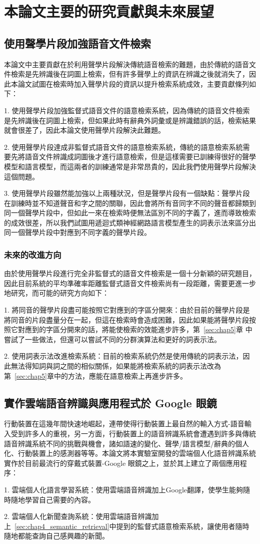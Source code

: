 \section{本論文主要的研究貢獻與未來展望}
\subsection{使用聲學片段加強語音文件檢索}
本論文中主要貢獻在於利用聲學片段解決傳統語音檢索的難題，由於傳統的語音文件檢索是先辨識後在詞圖上檢索，但有許多聲學上的資訊在辨識之後就消失了，因此本論文試圖在檢索時加入聲學片段的資訊以提升檢索系統成效，主要貢獻條列如下：

1. 使用聲學片段加強監督式語音文件的語意檢索系統，因為傳統的語音文件檢索是先辨識後在詞圖上檢索，但如果此時有辭典外詞彙或是辨識錯誤的話，檢索結果就會很差了，因此本論文使用聲學片段解決此難題。

2. 使用聲學片段達成非監督式語音文件的語意檢索系統，傳統的語意檢索系統需要先將語音文件辨識成詞圖後才進行語意檢索，但是這樣需要已訓練得很好的聲學模型和語言模型，而這兩者的訓練通常是非常昂貴的，因此我們使用聲學片段解決這個問題。

3. 使用聲學片段雖然能加強以上兩種狀況，但是聲學片段有一個缺點：聲學片段在訓練時並不知道聲音和字之間的關聯，因此會將所有音同字不同的聲音都歸類到同一個聲學片段中，但如此一來在檢索時便無法區別不同的字義了，進而導致檢索的成效很差，所以我們試圖用遞迴式類神經網路語言模型產生的詞表示法來區分出同一個聲學片段中對應到不同字義的聲學片段。

\subsubsection{未來的改進方向}
由於使用聲學片段進行完全非監督式的語音文件檢索是一個十分新穎的研究題目，因此目前系統的平均準確率距離監督式語音文件檢索尚有一段距離，需要更進一步地研究，而可能的研究方向如下：

1. 將同音的聲學片段盡可能按照它對應到的字區分開來：由於目前的聲學片段是將同音的片段盡量分在一起，但這在檢索時會造成困難，因此如果能將聲學片段按照它對應到的字區分開來的話，將能使檢索的效能進步許多，第~\ref{sec:chap5}章 中嘗試了一些做法，但還可以嘗試不同的分群演算法和更好的詞表示法。

2. 使用詞表示法改進檢索系統：目前的檢索系統仍然是使用傳統的詞表示法，因此無法得知詞與詞之間的相似關係，如果能將檢索系統的詞表示法改為 第~\ref{sec:chap5}章中的方法，應能在語意檢索上再進步許多。

\subsection{實作雲端語音辨識與應用程式於 Google 眼鏡}
行動裝置在這幾年間快速地崛起，連帶使得行動裝置上最自然的輸入方式-語音輸入受到許多人的重視，另一方面，行動裝置上的語音辨識系統會遭遇到許多與傳統語音辨識系統不同的挑戰與機會，諸如語速的變化、聲學/語言模型/辭典的個人化、行動裝置上的感測器等等。本論文將本實驗室開發的雲端個人化語音辨識系統實作於目前最流行的穿戴式裝置-Google 眼鏡之上，並於其上建立了兩個應用程序：

1. 雲端個人化語言學習系統：使用雲端語音辨識加上Google翻譯，使學生能夠隨時隨地學習自己需要的內容。

2. 雲端個人化新聞查詢系統：使用雲端語音辨識加上~\ref{sec:chap4_semantic_retrieval}中提到的監督式語意檢索系統，讓使用者隨時隨地都能查詢自己感興趣的新聞。
